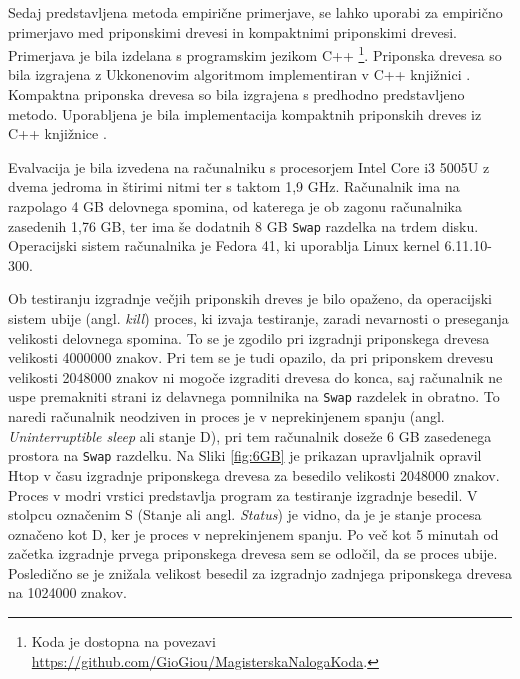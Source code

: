 Sedaj predstavljena metoda empirične primerjave, se lahko uporabi za empirično primerjavo med priponskimi drevesi in kompaktnimi priponskimi drevesi. Primerjava je bila izdelana s programskim jezikom C++ \footnote{Koda je dostopna na povezavi \url{https://github.com/GioGiou/MagisterskaNalogaKoda}.}. Priponska drevesa so bila izgrajena z Ukkonenovim algoritmom implementiran v C++ knjižnici \cite{ganeshk13}. Kompaktna priponska drevesa so bila izgrajena s predhodno predstavljeno metodo. Uporabljena je bila implementacija kompaktnih priponskih dreves iz C++ knjižnice \cite{gbmp2014sea}.

Evalvacija je bila izvedena na računalniku s procesorjem Intel Core i3 5005U z dvema jedroma in štirimi nitmi ter s taktom 1,9 GHz. Računalnik ima na razpolago 4 GB delovnega spomina, od katerega je ob zagonu računalnika zasedenih 1,76 GB, ter ima še dodatnih 8 GB \verb|Swap| razdelka na trdem disku. Operacijski sistem računalnika je Fedora 41, ki uporablja Linux kernel 6.11.10-300. 

Ob testiranju izgradnje večjih priponskih dreves je bilo opaženo, da operacijski sistem ubije (angl. \textit{kill}) proces, ki izvaja testiranje, zaradi nevarnosti o preseganja velikosti delovnega spomina. To se je zgodilo pri izgradnji priponskega drevesa velikosti 4000000 znakov. Pri tem se je tudi opazilo, da pri priponskem drevesu velikosti 2048000 znakov ni mogoče izgraditi drevesa do konca, saj računalnik ne uspe premakniti strani iz delavnega pomnilnika na \verb|Swap| razdelek in obratno. To naredi računalnik  neodziven in proces je v neprekinjenem spanju (angl. \textit{Uninterruptible sleep} ali stanje D), pri tem računalnik doseže 6 GB zasedenega prostora na \verb|Swap| razdelku. Na Sliki \ref{fig:6GB} je prikazan upravljalnik opravil Htop v času izgradnje priponskega drevesa za  besedilo velikosti 2048000 znakov. Proces v modri vrstici predstavlja program za testiranje izgradnje besedil. V stolpcu označenim S (Stanje ali angl. \textit{Status}) je vidno, da je je stanje procesa označeno kot D, ker je proces v neprekinjenem spanju. Po več kot 5 minutah od začetka izgradnje prvega priponskega drevesa sem se odločil, da se proces ubije. Posledično se je znižala velikost besedil za izgradnjo zadnjega priponskega drevesa na 1024000 znakov.

